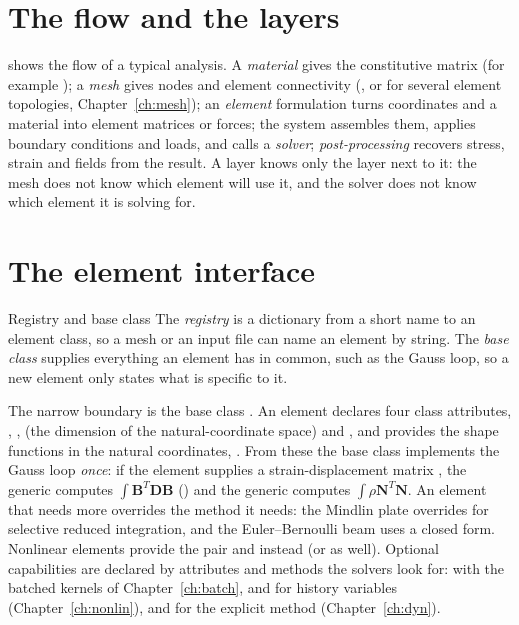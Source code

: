 \section{The flow and the layers}\label{sec:ar-flow}

 shows the flow of a typical analysis. A \emph{material} gives the constitutive matrix (for example ); a \emph{mesh} gives nodes and element connectivity (, or  for several element topologies, Chapter~\ref{ch:mesh}); an \emph{element} formulation turns coordinates and a material into element matrices or forces; the system  assembles them, applies boundary conditions and loads, and calls a \emph{solver}; \emph{post-processing} recovers stress, strain and fields from the result. A layer knows only the layer next to it: the mesh does not know which element will use it, and the solver does not know which element it is solving for.


\section{The element interface}\label{sec:ar-interface}

\begin{sidenote}{Registry and base class}
The \emph{registry}  is a dictionary from a short name to an element class, so a mesh or an input file can name an element by string. The \emph{base class}  supplies everything an element has in common, such as the Gauss loop, so a new element only states what is specific to it.
\end{sidenote}

The narrow boundary is the base class . An element declares four class attributes, , ,  (the dimension of the natural-coordinate space) and , and provides the shape functions in the natural coordinates, . From these the base class implements the Gauss loop \emph{once}: if the element supplies a strain-displacement matrix , the generic  computes $\int\bm B^{T}\bm D\bm B$ () and the generic  computes $\int\rho\bm N^{T}\bm N$. An element that needs more overrides the method it needs: the Mindlin plate overrides  for selective reduced integration, and the Euler--Bernoulli beam uses a closed form. Nonlinear elements provide the pair  and  instead (or as well). Optional capabilities are declared by attributes and methods the solvers look for:  with the batched kernels of Chapter~\ref{ch:batch},  and  for history variables (Chapter~\ref{ch:nonlin}), and  for the explicit method (Chapter~\ref{ch:dyn}).

